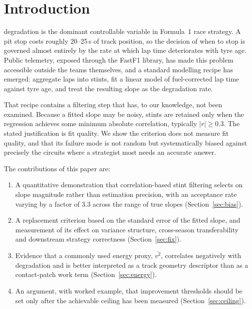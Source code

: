 \documentclass[conference]{IEEEtran}
\begin{document}
\section{Introduction}

 degradation is the dominant controllable variable in
Formula~1 race strategy. A pit stop costs roughly 20--25\,s of track position,
so the decision of when to stop is governed almost entirely by the rate at
which lap time deteriorates with tyre age. Public telemetry, exposed through
the FastF1 library, has made this problem accessible outside the teams
themselves, and a standard modelling recipe has emerged: aggregate laps into
stints, fit a linear model of fuel-corrected lap time against tyre age, and
treat the resulting slope as the degradation rate.

That recipe contains a filtering step that has, to our knowledge, not been
examined. Because a fitted slope may be noisy, stints are retained only when
the regression achieves some minimum absolute correlation, typically
$|r| \geq 0.3$. The stated justification is fit quality. We show the criterion
does not measure fit quality, and that its failure mode is not random but
systematically biased against precisely the circuits where a strategist most
needs an accurate answer.

The contributions of this paper are:

\begin{enumerate}
\item A quantitative demonstration that correlation-based stint filtering
      selects on slope magnitude rather than estimation precision, with an
      acceptance rate varying by a factor of 3.3 across the range of true
      slopes (Section~\ref{sec:bias}).
\item A replacement criterion based on the standard error of the fitted slope,
      and measurement of its effect on variance structure, cross-season
      transferability and downstream strategy correctness
      (Section~\ref{sec:fix}).
\item Evidence that a commonly used energy proxy, $\overline{v^2}$, correlates
      negatively with degradation and is better interpreted as a track
      geometry descriptor than as a contact-patch work term
      (Section~\ref{sec:energy}).
\item An argument, with worked example, that improvement thresholds should be
      set only after the achievable ceiling has been measured
      (Section~\ref{sec:ceiling}).
\end{enumerate}
\end{document}
